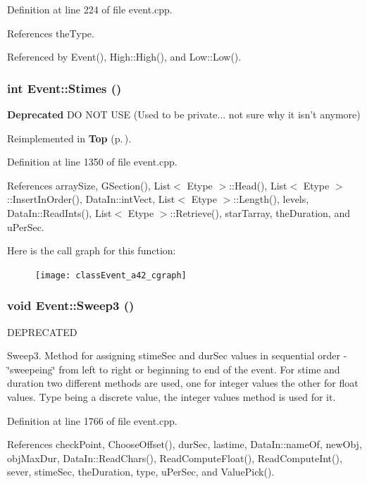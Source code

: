 Definition at line 224 of file event.cpp.

References the\-Type.

Referenced by Event(), High::High(), and Low::Low().
\subsubsection{\setlength{\rightskip}{0pt plus 5cm}int Event::Stimes ()}\label{classEvent_a42}


\begin{Desc}
\item[{\bf Deprecated}]DO NOT USE (Used to be private... not sure why it isn't anymore) \end{Desc}


Reimplemented in {\bf Top} {\rm (p.\,\pageref{classTop_d0})}.

Definition at line 1350 of file event.cpp.

References array\-Size, GSection(), List$<$ Etype $>$::Head(), List$<$ Etype $>$::Insert\-In\-Order(), Data\-In::int\-Vect, List$<$ Etype $>$::Length(), levels, Data\-In::Read\-Ints(), List$<$ Etype $>$::Retrieve(), star\-Tarray, the\-Duration, and u\-Per\-Sec.

Here is the call graph for this function:\begin{figure}[H]
\begin{center}
\leavevmode
\texttt{[image: classEvent\_a42\_cgraph]}
\end{center}
\end{figure}
\subsubsection{\setlength{\rightskip}{0pt plus 5cm}void Event::Sweep3 ()}\label{classEvent_a32}


DEPRECATED

Sweep3. Method for assigning stime\-Sec and dur\-Sec values in sequential order - \char`\"{}sweepeing\char`\"{} from left to right or beginning to end of the event. For stime and duration two different methods are used, one for integer values the other for float values. Type being a discrete value, the integer values method is used for it. 

Definition at line 1766 of file event.cpp.

References check\-Point, Choose\-Offset(), dur\-Sec, lastime, Data\-In::name\-Of, new\-Obj, obj\-Max\-Dur, Data\-In::Read\-Chars(), Read\-Compute\-Float(), Read\-Compute\-Int(), sever, stime\-Sec, the\-Duration, type, u\-Per\-Sec, and Value\-Pick().

